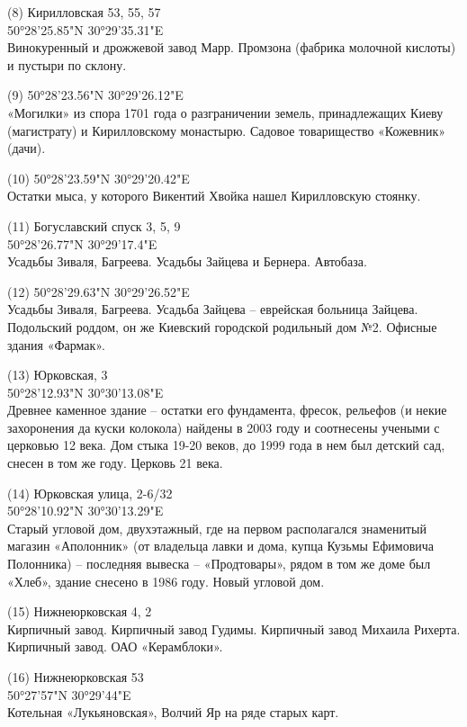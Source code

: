 \begin{flushleft}
(8) Кирилловская 53, 55, 57\\
50°28'25.85"N 30°29'35.31"E\\
Винокуренный и дрожжевой завод Марр. Промзона (фабрика молочной кислоты) и пустыри по склону.\\

\medskip

(9) 50°28'23.56"N 30°29'26.12"E\\
«Могилки» из спора 1701 года о разграничении земель, принадлежащих Киеву (магистрату) и Кирилловскому монастырю. Садовое товарищество «Кожевник» (дачи).\\

\medskip


(10) 50°28'23.59"N 30°29'20.42"E\\
Остатки мыса, у которого Викентий Хвойка нашел Кирилловскую стоянку.\\

\medskip


(11) Богуславский спуск 3, 5, 9\\
50°28'26.77"N 30°29'17.4"E\\
Усадьбы Зиваля, Багреева. Усадьбы Зайцева и Бернера. Автобаза.\\

\medskip


(12) 50°28'29.63"N 30°29'26.52"E\\
Усадьбы Зиваля, Багреева. Усадьба Зайцева – еврейская больница Зайцева. Подольский роддом, он же Киевский городской родильный дом №2. Офисные здания «Фармак».\\

\medskip


(13) Юрковская, 3\\
50°28'12.93"N 30°30'13.08"E\\
Древнее каменное здание – остатки его фундамента, фресок, рельефов (и некие захоронения да куски колокола) найдены в 2003 году и соотнесены учеными с церковью 12 века. Дом стыка 19-20 веков, до 1999 года в нем был детский сад, снесен в том же году. Церковь 21 века.\\

\medskip


(14) Юрковская улица, 2-6/32\\
50°28'10.92"N 30°30'13.29"E\\
Старый угловой дом, двухэтажный, где на первом располагался знаменитый магазин «Аполонник» (от владельца лавки и дома, купца Кузьмы Ефимовича Полонника) – последняя вывеска – «Продтовары», рядом в том же доме был «Хлеб», здание снесено в 1986 году. Новый угловой дом.\\

\medskip

(15) Нижнеюрковская 4, 2\\
Кирпичный завод. Кирпичный завод Гудимы. Кирпичный завод Михаила Рихерта. Кирпичный завод. ОАО «Керамблоки».\\

\medskip

(16) Нижнеюрковская 53\\
50°27'57"N 30°29'44"E\\
Котельная «Лукьяновская», Волчий Яр на ряде старых карт.
\end{flushleft}


